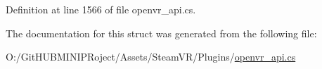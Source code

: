 Definition at line 1566 of file openvr\+\_\+api.\+cs.



The documentation for this struct was generated from the following file\+:\begin{DoxyCompactItemize}
\item 
O\+:/\+Git\+H\+U\+B\+M\+I\+N\+I\+P\+Roject/\+Assets/\+Steam\+V\+R/\+Plugins/\mbox{\hyperlink{openvr__api_8cs}{openvr\+\_\+api.\+cs}}\end{DoxyCompactItemize}
